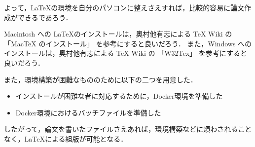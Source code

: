 よって，\LaTeX の環境を自分のパソコンに整えさえすれば，比較的容易に論文作成ができるであろう．

Macintosh への \LaTeX のインストールは，奥村他有志による TeX Wiki の 「MacTeX のインストール」\cite{mactex} を参考にすると良いだろう．
また，Windows へのインストールは，奥村他有志による TeX Wiki の 「W32Tex」\cite{w32tex} を参考にすると良いだろう．

また，環境構築が困難なもののために以下の二つを用意した．
\begin{itemize}
\item インストールが困難な者に対応するために，Docker環境を準備した
\item Docker環境におけるバッチファイルを準備した
\end{itemize}

したがって，論文を書いたファイルさえあれば，環境構築などに煩わされることなく，\LaTeX による組版が可能となる．
